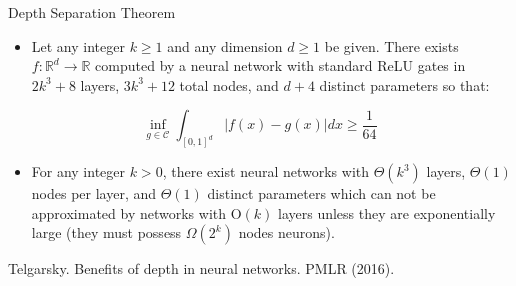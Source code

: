 \documentclass[serif, aspectratio=169]{beamer}
\begin{document}
\begin{frame}{Depth Separation Theorem}
	\begin{itemize}
		\item Let any integer $k \ge 1$ and any dimension $d \ge 1$ be given. There exists $f : \mathbb{R}^d \rightarrow \mathbb{R}$ computed by a neural network with standard ReLU gates in $2k^3 + 8$ layers, $3k^3 + 12$ total nodes, and $d+4$ distinct parameters so that:
	\end{itemize}
	\vspace{1em}
	$$
	\inf _{g \in \mathcal{C}} \int_{[0,1]^d}|f(x)-g(x)| d x \geq \frac{1}{64}
	$$
	\begin{itemize}
		\item For any integer $k>0$, there exist neural networks with $\Theta(k^3)$ layers, $\Theta(1)$ nodes per layer, and $\Theta(1)$ distinct parameters which can not be approximated by networks with {O}$(k)$ layers unless they are exponentially large (they must possess $\Omega(2^k)$ nodes neurons).
	\end{itemize}
	\vspace{1.4cm}
	\scriptsize Telgarsky. Benefits of depth in neural networks. PMLR (2016).
\end{frame}
\end{document}
